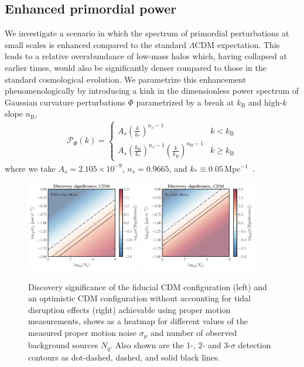\documentclass[prd,aps,twocolumn,nofootinbib,superscriptaddress,preprintnumbers,balancelastpage,longbibliography,floatfix]{revtex4-1}
\begin{document}
\subsection{Enhanced primordial power}\label{sec:enhanced}

We investigate a scenario in which the spectrum of primordial perturbations at small scales is enhanced compared to the standard $\Lambda$CDM expectation. This leads to a relative overabundance of low-mass halos which, having collapsed at earlier times, would also be significantly denser compared to those in the standard cosmological evolution. We parametrize this enhancement phenomenologically by introducing a kink in the dimensionless power spectrum of Gaussian curvature perturbations $\Phi$ parametrized by a break at $k_\mathrm{B}$ and high-$k$ slope $n_\mathrm{B}$,
\begin{align}
\mathcal{P}_{\Phi}(k) = \begin{cases} 
A_s \left( \frac{k}{k_*} \right)^{n_s -1} & k < k_\mathrm{B} \\ 
A_s \left( \frac{k_\mathrm{B}}{k_*} \right)^{n_s -1}\left( \frac{k}{k_\mathrm{B}} \right)^{n_\mathrm{B} -1} & k \ge k_\mathrm{B} 
\end{cases}
\end{align}
where we take $A_s = 2.105\times10^{-9}$, $n_s=0.9665$, and $k_*\equiv0.05$\,Mpc$^{-1}$~\cite{Aghanim:2018eyx}.

\begin{figure}[!htbp]
\centering
\includegraphics[width=0.45\textwidth]{plots/LCDM_disc.pdf}
\includegraphics[width=0.45\textwidth]{plots/LCDM_disc_notidal.pdf}
\caption{Discovery significance of the fiducial CDM configuration (left) and an optimistic CDM configuration without accounting for tidal disruption effects (right) achievable using proper motion measurements, shows as a heatmap for different values of the measured proper motion noise $\sigma_\mu$ and number of observed background sources $N_q$. Also shown are the 1-, 2- and 3-$\sigma$ detection contours as dot-dashed, dashed, and solid black lines. } \label{fig:lcdm_disc}
\end{figure}
\end{document}
